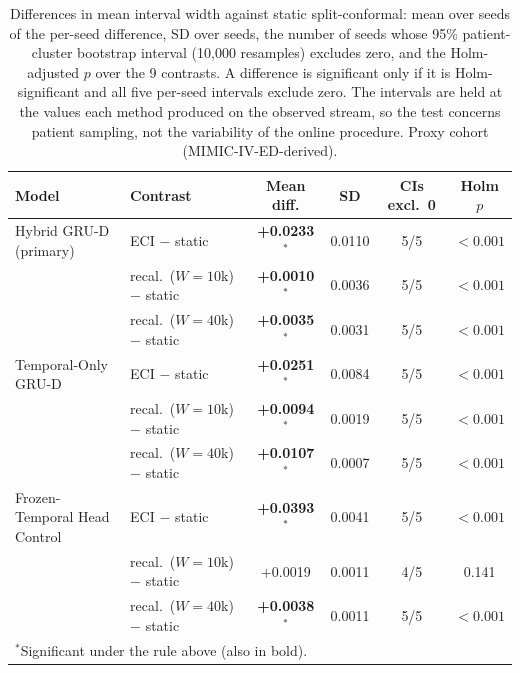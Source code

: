 \begin{table}[t]
\centering
\caption{Differences in mean interval width against static split-conformal: mean over seeds of the per-seed difference, SD over seeds, the number of seeds whose 95\% patient-cluster bootstrap interval (10,000 resamples) excludes zero, and the Holm-adjusted $p$ over the 9 contrasts. A difference is significant only if it is Holm-significant and all five per-seed intervals exclude zero. The intervals are held at the values each method produced on the observed stream, so the test concerns patient sampling, not the variability of the online procedure. Proxy cohort (MIMIC-IV-ED-derived).}
\label{tab:m2-rev-width-tests}
\begin{tabular}{llcccc}
\toprule
Model & Contrast & Mean diff. & SD & CIs excl.\ 0 & Holm $p$ \\
\midrule
Hybrid GRU-D (primary) & ECI $-$ static & \textbf{+0.0233$^{*}$} & 0.0110 & 5/5 & $<0.001$ \\
 & recal.\ ($W{=}10$k) $-$ static & \textbf{+0.0010$^{*}$} & 0.0036 & 5/5 & $<0.001$ \\
 & recal.\ ($W{=}40$k) $-$ static & \textbf{+0.0035$^{*}$} & 0.0031 & 5/5 & $<0.001$ \\
\midrule
Temporal-Only GRU-D & ECI $-$ static & \textbf{+0.0251$^{*}$} & 0.0084 & 5/5 & $<0.001$ \\
 & recal.\ ($W{=}10$k) $-$ static & \textbf{+0.0094$^{*}$} & 0.0019 & 5/5 & $<0.001$ \\
 & recal.\ ($W{=}40$k) $-$ static & \textbf{+0.0107$^{*}$} & 0.0007 & 5/5 & $<0.001$ \\
\midrule
Frozen-Temporal Head Control & ECI $-$ static & \textbf{+0.0393$^{*}$} & 0.0041 & 5/5 & $<0.001$ \\
 & recal.\ ($W{=}10$k) $-$ static & +0.0019 & 0.0011 & 4/5 & 0.141 \\
 & recal.\ ($W{=}40$k) $-$ static & \textbf{+0.0038$^{*}$} & 0.0011 & 5/5 & $<0.001$ \\
\bottomrule
\multicolumn{6}{l}{\footnotesize $^{*}$Significant under the rule above (also in bold).}
\end{tabular}
\end{table}
